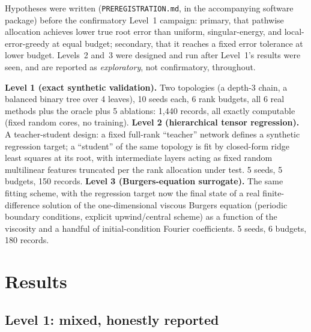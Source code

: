 \documentclass[11pt]{amsart}
\theoremstyle{remark}
\theoremstyle{definition}
\begin{document}
Hypotheses were written (\texttt{PREREGISTRATION.md}, in the accompanying software
package) before the confirmatory Level~1 campaign: primary, that pathwise allocation
achieves lower true root error than uniform, singular-energy, and local-error-greedy at
equal budget; secondary, that it reaches a fixed error tolerance at lower budget. Levels~2
and~3 were designed and run after Level~1's results were seen, and are reported as
\emph{exploratory}, not confirmatory, throughout.

\textbf{Level 1 (exact synthetic validation).} Two topologies (a depth-3 chain, a balanced
binary tree over 4 leaves), 10 seeds each, 6 rank budgets, all 6 real methods plus the
oracle plus 5 ablations: 1{,}440 records, all exactly computable (fixed random cores, no
training). \textbf{Level 2 (hierarchical tensor regression).} A teacher-student design: a
fixed full-rank ``teacher'' network defines a synthetic regression target; a ``student'' of
the same topology is fit by closed-form ridge least squares at its root, with intermediate
layers acting as fixed random multilinear features truncated per the rank allocation under
test. 5 seeds, 5 budgets, 150 records. \textbf{Level 3 (Burgers-equation surrogate).} The
same fitting scheme, with the regression target now the final state of a real
finite-difference solution of the one-dimensional viscous Burgers equation (periodic
boundary conditions, explicit upwind/central scheme) as a function of the viscosity and a
handful of initial-condition Fourier coefficients. 5 seeds, 6 budgets, 180 records.

\section{Results}

\subsection{Level 1: mixed, honestly reported}

\begin{center}
\small
{}
\end{center}
\end{document}
